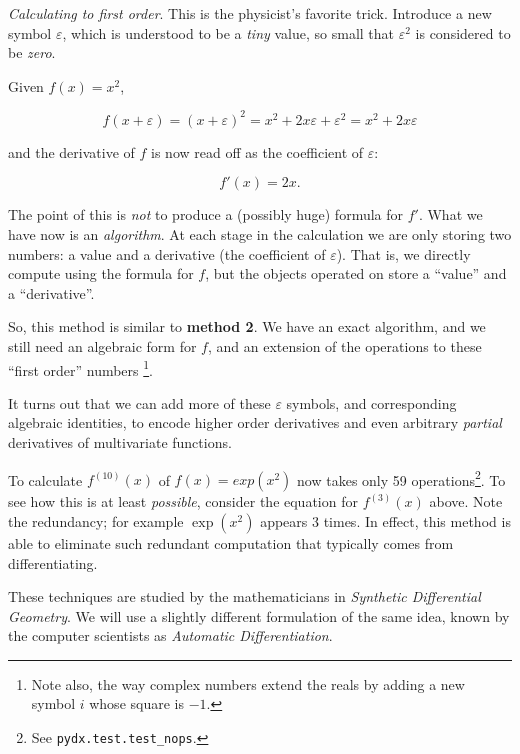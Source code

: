 \documentclass[11pt]{article}
\begin{document}
{\em Calculating to first order}.
This is the physicist's favorite trick.
Introduce a new symbol $\varepsilon$,
which is understood to be a {\em tiny} value, so small that $\varepsilon^2$ is considered
to be {\em zero}.

Given $f(x)=x^2$,

    $$ f(x+\varepsilon) = (x+\varepsilon)^2 = x^2 + 2x\varepsilon + \varepsilon^2 = x^2 + 2x\varepsilon $$

and the derivative of $f$ is now read off as the coefficient of $\varepsilon$:

    $$ f'(x) = 2x. $$

The point of this is {\em not} to produce a (possibly huge) formula for $f'$.
What we have now is an {\em algorithm}. 
At each stage in the calculation we are only
storing {two} numbers: a value and a derivative (the coefficient of $\varepsilon$).
That is, we directly compute using the formula for $f$, 
but the objects operated on store a ``value'' and a ``derivative''.

So, this method is similar to {\bf method 2}.
We have an exact algorithm, 
and we still need an algebraic form for $f$,
and an extension of the operations to these ``first order'' numbers
\footnote {Note also, the way complex numbers extend the
reals by adding a new symbol $i$ whose square is $-1$.}.

It turns out that we can add more of these $\varepsilon$ symbols, and corresponding
algebraic identities, to encode higher order derivatives and even
arbitrary {\em partial} derivatives of multivariate functions.

To calculate $f^{(10)}(x)$ of $f(x)=exp(x^2)$ now takes only 59 operations\footnote{See {\tt pydx.test.test\_nops}.}.
To see how this is at least {\em possible}, consider the equation for $f^{(3)}(x)$ above.
Note the redundancy; for example $\exp(x^2)$ appears 3 times.
In effect, this method is able to eliminate such redundant computation that
typically comes from differentiating.

These techniques are studied by the mathematicians in {\em Synthetic Differential Geometry}.
We will use a slightly different formulation of the same idea,
known by the computer scientists as {\em Automatic Differentiation}.

\def\bfe{\bf e}
\def\bfei{{\bf e}_{\it i}}
\def\bfj{\bf j}
\def\bfk{\bf k}
\def\bfn{\bf n}
\def\bfz{\bf 0}

\end{document}

